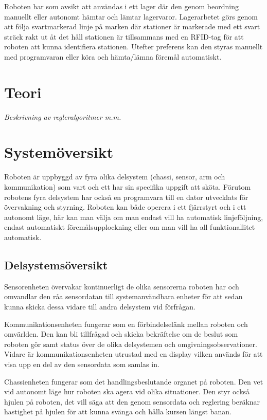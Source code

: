 \documentclass[a4paper,12pt]{article}
\begin{document}
Roboten har som avsikt att användas i ett lager där den genom beordning manuellt eller autonomt hämtar och lämtar lagervaror. Lagerarbetet görs genom att följa svartmarkerad linje på marken där stationer är markerade med ett svart sträck rakt ut åt det håll stationen är tillsammans med en RFID-tag för att roboten att kunna identifiera stationen. Utefter preferens kan den styras manuellt med programvaran eller köra och hämta/lämna föremål automatiskt.

\section{Teori}
\emph{Beskrivning av regleralgoritmer m.m.}

\section{Systemöversikt}
Roboten är uppbyggd av fyra olika delsystem (chassi, sensor, arm och kommunikation) som vart och ett har sin specifika uppgift att sköta. Förutom robotens fyra delsystem har också en programvara till en dator utvecklats för övervakning och styrning. Roboten kan både operera i ett fjärrstyrt och i ett autonomt läge, här kan man välja om man endast vill ha automatisk linjeföljning, endast automatiskt föremålsupplockning eller om man vill ha all funktionallitet automatisk.

\subsection{Delsystemsöversikt}
Sensorenheten övervakar kontinuerligt de olika sensorerna roboten har och omvandlar den råa sensordatan till systemanvändbara enheter för att sedan kunna skicka dessa vidare till andra delsystem vid förfrågan.

Kommunikationsenheten fungerar som en förbindelselänk mellan roboten och omvärlden. Den kan bli tillfrågad och skicka bekräftelse om de beslut som roboten gör samt status över de olika delsystemen och omgivningsobservationer. Vidare är kommunikationsenheten utrustad med en display vilken används för att visa upp en del av den sensordata som samlas in.

Chassienheten fungerar som det handlingsbeslutande organet på roboten. Den vet vid autonomt läge hur roboten ska agera vid olika situationer. Den styr också hjulen på roboten, det vill säga att den genom sensordata och reglering beräknar hastighet på hjulen för att kunna svänga och hålla kursen längst banan.
\end{document}

